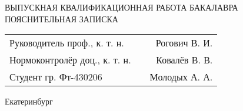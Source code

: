 \begin{titlepage}
\begin{center}
	\begin{center}	
			ВЫПУСКНАЯ КВАЛИФИКАЦИОННАЯ РАБОТА БАКАЛАВРА \\
			ПОЯСНИТЕЛЬНАЯ ЗАПИСКА
	\end{center}

	\begin{tabularx}{.8\textwidth}[t]{ l  X  r }
		Руководитель проф., к. т. н. & & Рогович В. И. \\
		Нормоконтролёр доц., к. т. н. & & Ковалёв В. В. \\
		Студент гр. Фт-430206 & & Молодых А. А.
	\end{tabularx}


	\par
	\vspace{3cm}

	\noindent Екатеринбург\\
	\\
\end{center}
\end{titlepage}
